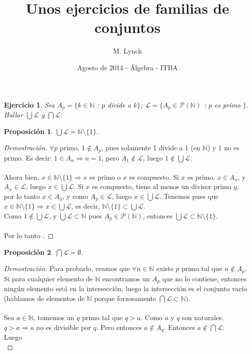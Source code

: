 \documentclass{article}
\title{Unos ejercicios de familias de conjuntos}
\author{M. Lynch}
\date{Agosto de 2014 - Álgebra - ITBA}
\newtheorem*{ejercicio}{Ejercicio}
\newtheorem*{proposicion}{Proposición}
\begin{document}
\maketitle

\begin{ejercicio}
Sea $A_p = \{ k \in \mathbb{N}$ : $p$ divide a $k\}$;  $\mathscr{L} = \{A_p \in \mathcal{P}(\mathbb{N})$ : $p$ es primo $\}$. Hallar $\bigcup\mathscr{L}$ y $\bigcap\mathscr{L}$.
\end{ejercicio}
\begin{proposicion}
$\bigcup\mathscr{L} = \mathbb{N} \setminus \{ 1 \}$.
\end{proposicion}
\begin{proof}[Demostración]
$\forall p$ primo, $1\notin A_p$, pues solamente 1 divide a 1 (en $\mathbb{N}$) y $1$ no es primo. Es decir: $1 \in A_n \Rightarrow n = 1$, pero $A_1 \notin \mathscr{L}$, luego $1 \notin \bigcup\mathscr{L}$.\\ \\
Ahora bien, $x \in \mathbb{N} \setminus \{1\} \Rightarrow x$ es primo o $x$ es compuesto. Si $x$ es primo, $x \in A_x$, y $A_x \in \mathscr{L}$, luego $x \in \bigcup\mathscr{L}$. Si $x$ es compuesto, tiene al menos un divisor primo $y$, por lo tanto $x \in A_y$, y como $A_y \in \mathscr{L}$, luego $x \in \bigcup\mathscr{L}$. Tenemos pues que $x \in \mathbb{N} \setminus \{1\} \Rightarrow x \in \bigcup\mathscr{L}$, es decir, $\mathbb{N} \setminus \{1\} \subset \bigcup\mathscr{L}$. \\ Como $1 \notin \bigcup\mathscr{L}$, y $\bigcup\mathscr{L} \subset \mathbb{N}$ pues $A_p \in \mathcal{P}(\mathbb{N})$, entonces $\bigcup\mathscr{L} \subset \mathbb{N} \setminus \{1\}$. \\ \\ Por lo tanto .
\end{proof}

\begin{proposicion}
$\bigcap\mathscr{L} = \emptyset$.
\end{proposicion}

\begin{proof}[Demostración]
Para probarlo, veamos que $\forall n \in \mathbb{N}$ existe $p$ primo tal que $n\notin A_p$. Si para cualquier elemento de $\mathbb{N}$ encontramos un $A_p$ que no lo contiene, entonces ningún elemento está en la intersección, luego la intersección es el conjunto vacío (hablamos de elementos de $\mathbb{N}$ porque forzosamente $\bigcap\mathscr{L} \subset \mathbb{N})$.\\ \\
Sea $a\in \mathbb{N}$, tomemos un $q$ primo tal que $q > a$. Como $a$ y $q$ son naturales, $q > a \Rightarrow a$ no es divisible por $q$. Pero entonces $a \notin A_q$. Entonces $a \notin \bigcap\mathscr{L}$. \\ Luego \\
\end{proof}
\end{document}

